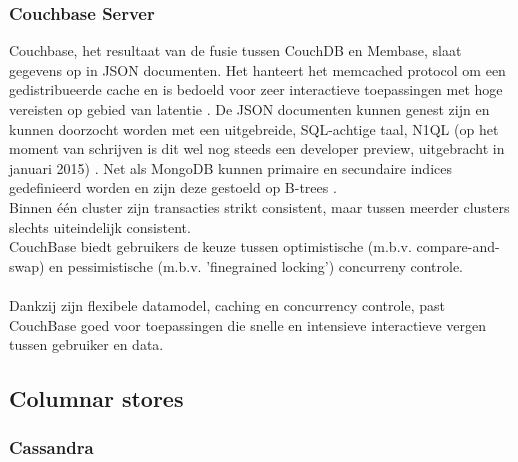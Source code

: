 \subsubsection{Couchbase Server}

Couchbase, het resultaat van de fusie tussen CouchDB en Membase, slaat gegevens op in JSON documenten. Het hanteert het memcached protocol om een gedistribueerde cache en is bedoeld voor zeer interactieve toepassingen met hoge vereisten op gebied van latentie \cite{grolinger2013data}\cite{couchbase_about}.
De JSON documenten kunnen genest zijn en kunnen doorzocht worden met een uitgebreide, SQL-achtige taal, N1QL (op het moment van schrijven is dit wel nog steeds een developer preview, uitgebracht in januari 2015) \cite{couchbase_n1ql}.
Net als MongoDB kunnen primaire en secundaire indices gedefinieerd worden en zijn deze gestoeld op B-trees \cite{couchbase_index}.\\
Binnen \'e\'en cluster zijn transacties strikt consistent, maar tussen meerder clusters slechts uiteindelijk consistent.\\
CouchBase biedt gebruikers de keuze tussen optimistische (m.b.v. compare-and-swap) en pessimistische (m.b.v. 'finegrained locking') concurreny controle.\\\\
Dankzij zijn flexibele datamodel, caching en concurrency controle, past CouchBase goed voor toepassingen die snelle en intensieve interactieve vergen tussen gebruiker en data.

\subsection{Columnar stores}

\subsubsection{Cassandra}

